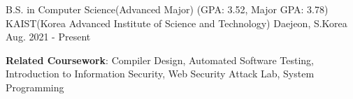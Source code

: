 \vspace{-2mm}


\begin{cventries}

  \cventry
    {B.S. in Computer Science(Advanced Major) (GPA: 3.52, Major GPA: 3.78)} %
    {KAIST(Korea Advanced Institute of Science and Technology)} %
    {Daejeon, S.Korea} %
    {Aug. 2021 - Present} %
    {
      \begin{cvitems} %
        \item \textbf{Related Coursework}: Compiler Design, Automated Software Testing, Introduction to Information Security, Web Security Attack Lab, System Programming
        \end{cvitems}
    }
\end{cventries}
